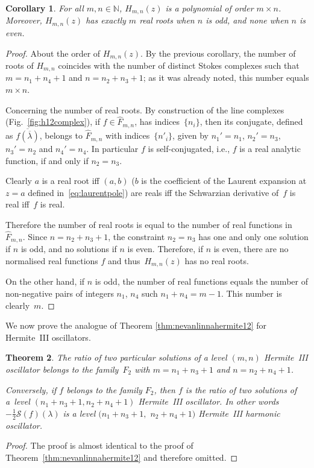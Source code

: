 \documentclass[pdftex]{sigma}
\numberwithin{equation}{section}
\newtheorem{thm}{Theorem}[section]
\newtheorem{cor}[thm]{Corollary}
\newcommand{\la}{\lambda}
\begin{document}
\begin{cor}\label{cor:numberrealroots}
 For all $m,n\in\mathbb{N}$, $H_{m,n}(z)$ is a polynomial of order $m \times n$. Moreover, $H_{m,n}(z)$ has exactly $m$ real roots when $n$ is odd, and none when $n$ is even.
\end{cor}
 \begin{proof} About the order of $H_{m,n}(z)$. By the previous corollary, the number of roots of $H_{m,n}$ coincides with the number of distinct
 Stokes complexes such that $m=n_1+n_4+1$ and $n=n_2+n_3+1$; as it was already noted, this number equals $m \times n$.

 Concerning the number of real roots. By construction of the line complexes (Fig.~\ref{fig:h12complex}), if $f \in \widehat{F}_{m,n} $, has indices~$\{n_i\}$, then its conjugate, def\/ined as $\overline{f(\overline{\la})}$, belongs to $\widehat{F}_{m,n} $ with indi\-ces~$\{n'_i\}$, given by $n_1'=n_1$, $n_2'=n_3$, $n_3'=n_2$ and $n_4'=n_4$. In particular $f$ is self-conjugated, i.e., $f$ is a real analytic function, if and only if $n_2=n_3$.

 Clearly $a$ is a real root if\/f $(a,b)$ ($b$ is the coef\/f\/icient of the Laurent expansion at $z=a$ def\/ined in~\eqref{eq:laurentpole}) are reals
 if\/f the Schwarzian derivative of~$f$ is real if\/f~$f$ is real.

 Therefore the number of real roots is equal to the number of real functions in $\widehat{F}_{m,n}$. Since $n=n_2+n_3+1$, the constraint $n_2=n_3$ has one and only one solution if $n$ is odd, and no solutions if $n$ is even. Therefore, if $n$ is even, there are no normalised real functions $f$ and thus~$H_{m,n}(z)$ has no real roots.

 On the other hand, if $n$ is odd, the number of real functions equals the number of non-negative pairs of integers $n_1$, $n_4$ such $n_1+n_4=m-1$. This
 number is clearly~$m$.
 \end{proof}

We now prove the analogue of Theorem \ref{thm:nevanlinnahermite12} for Hermite~III oscillators.

\begin{thm}\label{thm:nevanlinnahermite3} The ratio of two particular solutions of a level $(m,n)$ Hermite~III oscillator belongs to the family~$F_2$ with $m=n_1+n_3+1$ and $n=n_2+n_4+1$.

Conversely, if $f$ belongs to the family $F_2$, then $f$ is the ratio of two solutions of a~level $(n_1+n_3+1,n_2+n_4+1)$ Hermite~III oscillator. In other words $-\frac12 \mathcal{S}(f)(\la)$ is a level $(n_1+n_3+1,$ $n_2+n_4+1)$ Hermite~III harmonic oscillator.
\end{thm}
\begin{proof}
The proof is almost identical to the proof of Theorem~\ref{thm:nevanlinnahermite12} and therefore omitted.
\end{proof}
	
\end{document}
